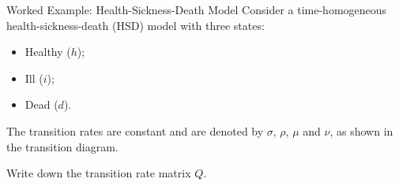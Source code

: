 \documentclass[
  ignorenonframetext,
  aspectratio=169,
]{beamer}
\providecommand{\tightlist}{%
  \setlength{\itemsep}{0pt}\setlength{\parskip}{0pt}}
\begin{document}
\begin{frame}{Worked Example: Health-Sickness-Death Model}
\protect{}\label{worked-example-health-sickness-death-model}
Consider a time-homogeneous health-sickness-death (HSD) model with three
states:

\begin{itemize}
\tightlist
\item
  Healthy (\(h\));
\item
  Ill (\(i\));
\item
  Dead (\(d\)).
\end{itemize}

The transition rates are constant and are denoted by \(\sigma\),
\(\rho\), \(\mu\) and \(\nu\), as shown in the transition diagram.

Write down the transition rate matrix \(Q\).
\end{frame}
\end{document}
